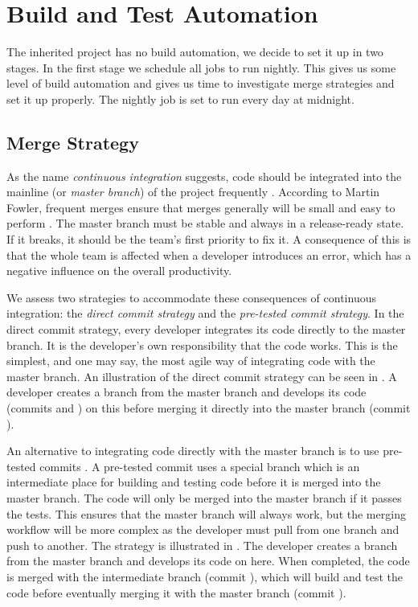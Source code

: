 \section{Build and Test Automation}\label{sec:build_automation}
The inherited project has no build automation, we decide to set it up in two stages. In the first stage we schedule all jobs to run nightly. This gives us some level of build automation and gives us time to investigate merge strategies and set it up properly. The nightly job is set to run every day at midnight.

\subsection{Merge Strategy}\label{sec:branching_strategy}
As the name \emph{continuous integration} suggests, code should be integrated into the mainline (or \emph{master branch}) of the project frequently \parencite{fowlerCI}. According to Martin Fowler, frequent merges ensure that merges generally will be small and easy to perform \parencite{fowlerFeatureBranch}. The master branch must be stable and always in a release-ready state. If it breaks, it should be the team's first priority to fix it. A consequence of this is that the whole team is affected when a developer introduces an error, which has a negative influence on the overall productivity.

We assess two strategies to accommodate these consequences of continuous integration: the \emph{direct commit strategy} and the \emph{pre-tested commit strategy}. In the direct commit strategy, every developer integrates its code directly to the master branch. It is the developer's own responsibility that the code works. This is the simplest, and one may say, the most agile way of integrating code with the master branch. An illustration of the direct commit strategy can be seen in . A developer creates a branch from the master branch and develops its code (commits  and ) on this before merging it directly into the master branch (commit ).

An alternative to integrating code directly with the master branch is to use pre-tested commits \parencite{fowlerPendingHead}. A pre-tested commit uses a special branch which is an intermediate place for building and testing code before it is merged into the master branch. The code will only be merged into the master branch if it passes the tests. This ensures that the master branch will always work, but the merging workflow will be more complex as the developer must pull from one branch and push to another. The strategy is illustrated in . The developer creates a branch from the master branch and develops its code on here. When completed, the code is merged with the intermediate branch (commit \emph{}), which will build and test the code before eventually merging it with the master branch (commit ).

